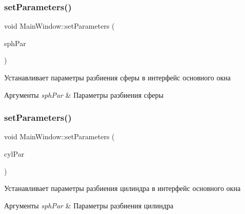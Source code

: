 \subsubsection{\texorpdfstring{set\+Parameters()}{setParameters()}\hspace{0.1cm}{\footnotesize\ttfamily [1/3]}}
{\footnotesize\ttfamily void Main\+Window\+::set\+Parameters (\begin{DoxyParamCaption}\item[{\mbox{\hyperlink{struct_sphere_parameters}{Sphere\+Parameters}} \&}]{sph\+Par }\end{DoxyParamCaption})\hspace{0.3cm}{\ttfamily [private]}}

Устанавливает параметры разбиения сферы в интерфейс основного окна 
\begin{DoxyParams}{Аргументы}
{\em sph\+Par} & Параметры разбиения сферы \\
\hline
\end{DoxyParams}
\mbox{\label{class_main_window_a9923fe4ddabc8c7ccdd1917ff85b7a8e}} 
\subsubsection{\texorpdfstring{set\+Parameters()}{setParameters()}\hspace{0.1cm}{\footnotesize\ttfamily [2/3]}}
{\footnotesize\ttfamily void Main\+Window\+::set\+Parameters (\begin{DoxyParamCaption}\item[{\mbox{\hyperlink{struct_cylinder_parameters}{Cylinder\+Parameters}} \&}]{cyl\+Par }\end{DoxyParamCaption})\hspace{0.3cm}{\ttfamily [private]}}

Устанавливает параметры разбиения цилиндра в интерфейс основного окна 
\begin{DoxyParams}{Аргументы}
{\em sph\+Par} & Параметры разбиения цилиндра \\
\hline
\end{DoxyParams}
\mbox{\label{class_main_window_aab98868ae81e753a51d161038105b493}} 
